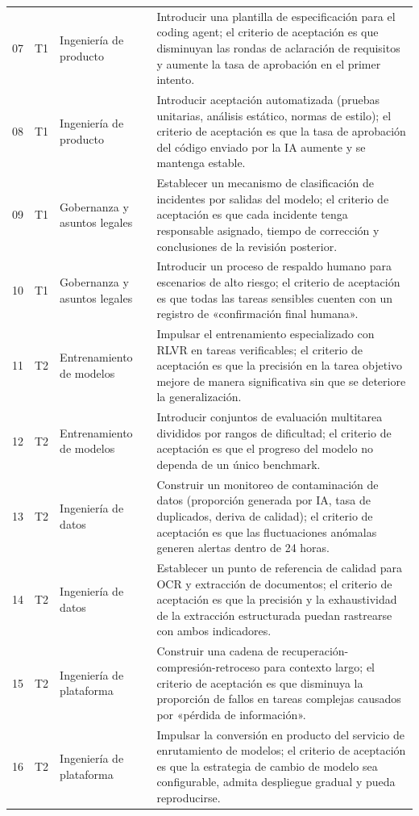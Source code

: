 \begin{longtable}{p{}p{}p{}p{}}
07 & T1 & Ingeniería de producto & Introducir una plantilla de especificación para el coding agent; el criterio de aceptación es que disminuyan las rondas de aclaración de requisitos y aumente la tasa de aprobación en el primer intento. \\
08 & T1 & Ingeniería de producto & Introducir aceptación automatizada (pruebas unitarias, análisis estático, normas de estilo); el criterio de aceptación es que la tasa de aprobación del código enviado por la IA aumente y se mantenga estable. \\
09 & T1 & Gobernanza y asuntos legales & Establecer un mecanismo de clasificación de incidentes por salidas del modelo; el criterio de aceptación es que cada incidente tenga responsable asignado, tiempo de corrección y conclusiones de la revisión posterior. \\
10 & T1 & Gobernanza y asuntos legales & Introducir un proceso de respaldo humano para escenarios de alto riesgo; el criterio de aceptación es que todas las tareas sensibles cuenten con un registro de «confirmación final humana». \\
11 & T2 & Entrenamiento de modelos & Impulsar el entrenamiento especializado con RLVR en tareas verificables; el criterio de aceptación es que la precisión en la tarea objetivo mejore de manera significativa sin que se deteriore la generalización. \\
12 & T2 & Entrenamiento de modelos & Introducir conjuntos de evaluación multitarea divididos por rangos de dificultad; el criterio de aceptación es que el progreso del modelo no dependa de un único benchmark. \\
13 & T2 & Ingeniería de datos & Construir un monitoreo de contaminación de datos (proporción generada por IA, tasa de duplicados, deriva de calidad); el criterio de aceptación es que las fluctuaciones anómalas generen alertas dentro de 24 horas. \\
14 & T2 & Ingeniería de datos & Establecer un punto de referencia de calidad para OCR y extracción de documentos; el criterio de aceptación es que la precisión y la exhaustividad de la extracción estructurada puedan rastrearse con ambos indicadores. \\
15 & T2 & Ingeniería de plataforma & Construir una cadena de recuperación-compresión-retroceso para contexto largo; el criterio de aceptación es que disminuya la proporción de fallos en tareas complejas causados por «pérdida de información». \\
16 & T2 & Ingeniería de plataforma & Impulsar la conversión en producto del servicio de enrutamiento de modelos; el criterio de aceptación es que la estrategia de cambio de modelo sea configurable, admita despliegue gradual y pueda reproducirse. \\

\end{longtable}
